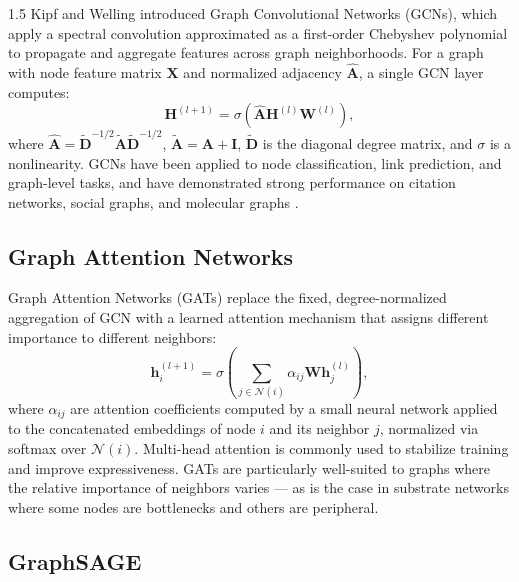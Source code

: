 \documentclass[A4paper,12pt]{report}
\theoremstyle{plain}
\theoremstyle{definition}
\theoremstyle{remark}
\numberwithin{equation}{section}
\begin{document}
\begin{spacing}{1.5}
Kipf and Welling \cite{kipf2017} introduced Graph Convolutional Networks (GCNs), which apply a spectral convolution approximated as a first-order Chebyshev polynomial to propagate and aggregate features across graph neighborhoods. For a graph with node feature matrix $\mathbf{X}$ and normalized adjacency $\hat{\mathbf{A}}$, a single GCN layer computes:
\begin{equation}
\mathbf{H}^{(l+1)} = \sigma\!\left(\hat{\mathbf{A}} \mathbf{H}^{(l)} \mathbf{W}^{(l)}\right),
\end{equation}
where $\hat{\mathbf{A}} = \tilde{\mathbf{D}}^{-1/2} \tilde{\mathbf{A}} \tilde{\mathbf{D}}^{-1/2}$, $\tilde{\mathbf{A}} = \mathbf{A} + \mathbf{I}$, $\tilde{\mathbf{D}}$ is the diagonal degree matrix, and $\sigma$ is a nonlinearity. GCNs have been applied to node classification, link prediction, and graph-level tasks, and have demonstrated strong performance on citation networks, social graphs, and molecular graphs \cite{kipf2017}.

\subsection{Graph Attention Networks}

Graph Attention Networks (GATs) \cite{velickovic2018} replace the fixed, degree-normalized aggregation of GCN with a learned attention mechanism that assigns different importance to different neighbors:
\begin{equation}
\mathbf{h}_i^{(l+1)} = \sigma\!\left(\sum_{j \in \mathcal{N}(i)} \alpha_{ij} \mathbf{W} \mathbf{h}_j^{(l)}\right),
\end{equation}
where $\alpha_{ij}$ are attention coefficients computed by a small neural network applied to the concatenated embeddings of node $i$ and its neighbor $j$, normalized via softmax over $\mathcal{N}(i)$. Multi-head attention \cite{vaswani2017} is commonly used to stabilize training and improve expressiveness. GATs are particularly well-suited to graphs where the relative importance of neighbors varies — as is the case in substrate networks where some nodes are bottlenecks and others are peripheral.

\subsection{GraphSAGE}


\end{spacing}
\end{document}
